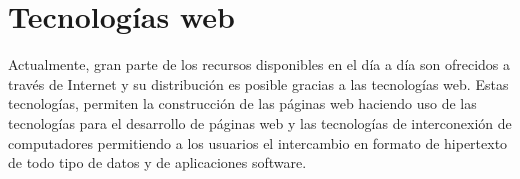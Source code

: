 \section{Tecnologías web}
\label{sec:tecnologias_web}

Actualmente, gran parte de los recursos disponibles en el día a día son ofrecidos a través de Internet y su distribución es posible gracias a las tecnologías web. Estas tecnologías, permiten la construcción de las páginas web haciendo uso de las tecnologías para el desarrollo de páginas web y las tecnologías de interconexión de computadores permitiendo a los usuarios el intercambio en formato de hipertexto de todo tipo de datos y de aplicaciones software.




